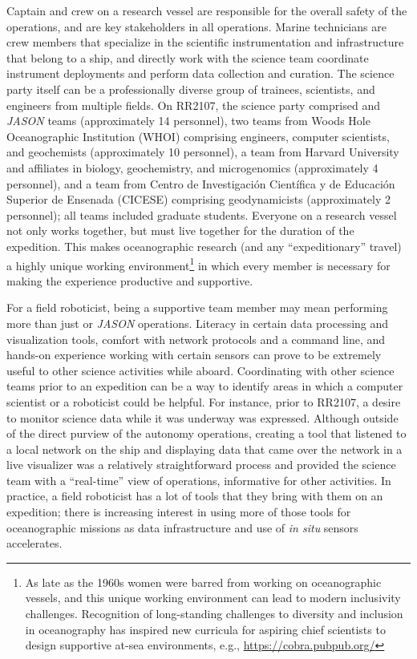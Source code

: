 Captain and crew on a research vessel are responsible for the overall safety of the operations, and are key stakeholders in all operations. Marine technicians are crew members that specialize in the scientific instrumentation and infrastructure that belong to a ship, and directly work with the science team coordinate instrument deployments and perform data collection and curation. The science party itself can be a professionally diverse group of trainees, scientists, and engineers from multiple fields. On RR2107, the science party comprised \Sentry and \emph{JASON} teams (approximately 14 personnel), two teams from Woods Hole Oceanographic Institution (WHOI) comprising engineers, computer scientists, and geochemists (approximately 10 personnel), a team from Harvard University and affiliates in biology, geochemistry, and microgenomics (approximately 4 personnel), and a team from Centro de Investigaci\'on Cient\'ifica y de Educaci\'on Superior de Ensenada (CICESE) comprising geodynamicists (approximately 2 personnel); all teams included graduate students. Everyone on a research vessel not only works together, but must live together for the duration of the expedition. This makes oceanographic research (and any ``expeditionary'' travel) a highly unique working environment\footnote{As late as the 1960s women were barred from working on oceanographic vessels, and this unique working environment can lead to modern inclusivity challenges. Recognition of long-standing challenges to diversity and inclusion in oceanography has inspired new curricula for aspiring chief scientists to design supportive at-sea environments, e.g., \url{https://cobra.pubpub.org/}} in which every member is necessary for making the experience productive and supportive.  

For a field roboticist, being a supportive team member may mean performing more than just \Sentry or \emph{JASON} operations. Literacy in certain data processing and visualization tools, comfort with network protocols and a command line, and hands-on experience working with certain sensors can prove to be extremely useful to other science activities while aboard. Coordinating with other science teams prior to an expedition can be a way to identify areas in which a computer scientist or a roboticist could be helpful. For instance, prior to RR2107, a desire to monitor \Sentry science data while it was underway was expressed. Although outside of the direct purview of the autonomy operations, creating a tool that listened to a local network on the ship and displaying data that came over the network in a live visualizer was a relatively straightforward process and provided the science team with a ``real-time'' view of \Sentry operations, informative for other activities. In practice, a field roboticist has a lot of tools that they bring with them on an expedition; there is increasing interest in using more of those tools for oceanographic missions as data infrastructure and use of \emph{in situ} sensors accelerates.  

